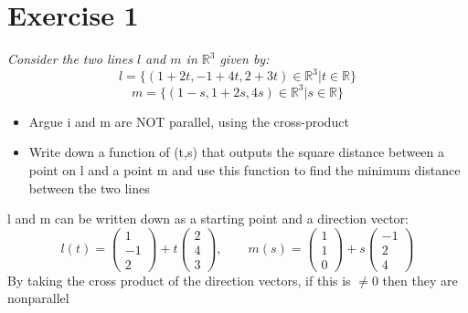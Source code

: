 \section{Exercise 1}
\textit{Consider the two lines $l$ and $m$ in $\mathbb{R}^3$ given by:}
\[l = \{(1 +2t, -1+4t,2+3t) \in \mathbb{R}^3 | t \in \mathbb{R}\}\]
\[m = \{(1-s,1+2s,4s)\in \mathbb{R}^3 | s \in \mathbb{R}\}\]

\begin{itemize}
    \item Argue i and m are NOT parallel, using the cross-product
    \item Write down a function of (t,s) that outputs the square distance between a point on l and a point m and use this function to find the minimum distance between the two lines
\end{itemize}

l and m can be written down as a starting point and a direction vector:
\[l(t) = 
\begin{pmatrix}
    1\\
    -1\\
    2
\end{pmatrix}
+ t
\begin{pmatrix}
    2\\
    4\\
    3
\end{pmatrix},
\qquad
m(s) = 
\begin{pmatrix}
    1\\
    1\\
    0
\end{pmatrix}
+ s 
\begin{pmatrix}
    -1\\
    2\\
    4
\end{pmatrix}
\]
By taking the cross product of the direction vectors, if this is $\neq 0$ then they are nonparallel

